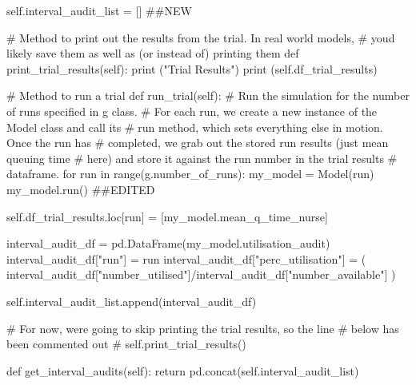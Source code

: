 \documentclass[
  letterpaper,
  DIV=11,
  numbers=noendperiod]{scrreprt}
\newenvironment{Shaded}{\begin{snugshade}}{\end{snugshade}}
\newcommand{\BuiltInTok}[1]{\textcolor[rgb]{0.00,0.23,0.31}{#1}}
\newcommand{\CommentTok}[1]{\textcolor[rgb]{0.37,0.37,0.37}{#1}}
\newcommand{\ControlFlowTok}[1]{\textcolor[rgb]{0.00,0.23,0.31}{#1}}
\newcommand{\KeywordTok}[1]{\textcolor[rgb]{0.00,0.23,0.31}{#1}}
\newcommand{\NormalTok}[1]{\textcolor[rgb]{0.00,0.23,0.31}{#1}}
\newcommand{\OperatorTok}[1]{\textcolor[rgb]{0.37,0.37,0.37}{#1}}
\newcommand{\StringTok}[1]{\textcolor[rgb]{0.13,0.47,0.30}{#1}}
\newcommand{\VariableTok}[1]{\textcolor[rgb]{0.07,0.07,0.07}{#1}}
\begin{document}
\begin{tcolorbox}
\begin{Shaded}
\begin{Highlighting}[]
        \VariableTok{self}\NormalTok{.interval\_audit\_list }\OperatorTok{=}\NormalTok{ [] }\CommentTok{\#\#NEW}

    \CommentTok{\# Method to print out the results from the trial.  In real world models,}
    \CommentTok{\# you\textquotesingle{}d likely save them as well as (or instead of) printing them}
    \KeywordTok{def}\NormalTok{ print\_trial\_results(}\VariableTok{self}\NormalTok{):}
        \BuiltInTok{print}\NormalTok{ (}\StringTok{"Trial Results"}\NormalTok{)}
        \BuiltInTok{print}\NormalTok{ (}\VariableTok{self}\NormalTok{.df\_trial\_results)}

    \CommentTok{\# Method to run a trial}
    \KeywordTok{def}\NormalTok{ run\_trial(}\VariableTok{self}\NormalTok{):}
        \CommentTok{\# Run the simulation for the number of runs specified in g class.}
        \CommentTok{\# For each run, we create a new instance of the Model class and call its}
        \CommentTok{\# run method, which sets everything else in motion.  Once the run has}
        \CommentTok{\# completed, we grab out the stored run results (just mean queuing time}
        \CommentTok{\# here) and store it against the run number in the trial results}
        \CommentTok{\# dataframe.}
        \ControlFlowTok{for}\NormalTok{ run }\KeywordTok{in} \BuiltInTok{range}\NormalTok{(g.number\_of\_runs):}
\NormalTok{            my\_model }\OperatorTok{=}\NormalTok{ Model(run)}
\NormalTok{            my\_model.run() }\CommentTok{\#\#EDITED}

            \VariableTok{self}\NormalTok{.df\_trial\_results.loc[run] }\OperatorTok{=}\NormalTok{ [my\_model.mean\_q\_time\_nurse]}

\NormalTok{            interval\_audit\_df }\OperatorTok{=}\NormalTok{ pd.DataFrame(my\_model.utilisation\_audit)}
\NormalTok{            interval\_audit\_df[}\StringTok{"run"}\NormalTok{] }\OperatorTok{=}\NormalTok{ run}
\NormalTok{            interval\_audit\_df[}\StringTok{"perc\_utilisation"}\NormalTok{] }\OperatorTok{=}\NormalTok{ (}
\NormalTok{              interval\_audit\_df[}\StringTok{"number\_utilised"}\NormalTok{]}\OperatorTok{/}\NormalTok{interval\_audit\_df[}\StringTok{"number\_available"}\NormalTok{]}
\NormalTok{            )}

            \VariableTok{self}\NormalTok{.interval\_audit\_list.append(interval\_audit\_df)}

        \CommentTok{\# For now, we\textquotesingle{}re going to skip printing the trial results, so the line}
        \CommentTok{\# below has been commented out}
        \CommentTok{\# self.print\_trial\_results()}

    \KeywordTok{def}\NormalTok{ get\_interval\_audits(}\VariableTok{self}\NormalTok{):}
      \ControlFlowTok{return}\NormalTok{ pd.concat(}\VariableTok{self}\NormalTok{.interval\_audit\_list)}
\end{Highlighting}
\end{Shaded}

\end{tcolorbox}
\end{document}
